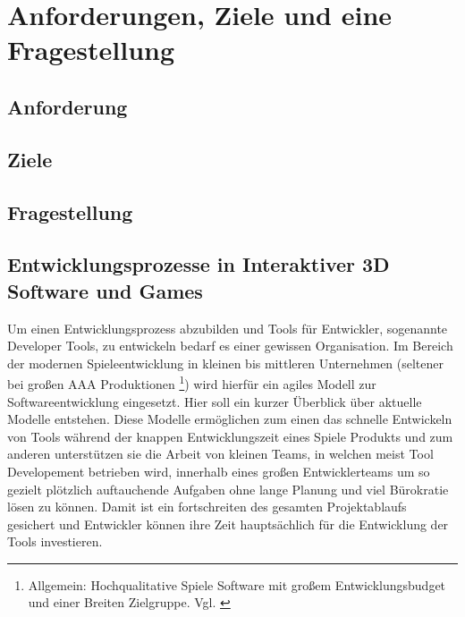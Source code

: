 \documentclass[pagesize, paper=a4, fontsize=12pt,titlepage=true, headings=small, headnosepline, abstractoff, liststotoc, nochapterprefix, plainheadsepline, twoside]{scrreprt}
\begin{document}
\begingroup
	\clearpage
	\pagestyle{empty}
	\tableofcontents
	\clearpage
\endgroup
\newpage
\thispagestyle{empty}
\mbox{}


\renewcommand*{\chapterpagestyle}{plain}
\pagestyle{plain}
\setcounter{page}{0}

\chapter{Anforderungen, Ziele und eine Fragestellung}

\section{Anforderung}
\section{Ziele}
\section{Fragestellung}

\section{Entwicklungsprozesse in Interaktiver 3D Software und Games}
Um einen Entwicklungsprozess abzubilden und Tools für Entwickler, sogenannte Developer Tools, zu entwickeln bedarf es einer gewissen Organisation. Im Bereich der modernen Spieleentwicklung in kleinen bis mittleren Unternehmen (seltener bei großen AAA Produktionen \footnote{Allgemein: Hochqualitative Spiele Software mit großem Entwicklungsbudget und einer Breiten Zielgruppe. Vgl. \cite{GamasutraAAA2005} }) wird hierfür ein agiles Modell zur Softwareentwicklung eingesetzt. Hier soll ein kurzer Überblick über aktuelle Modelle entstehen. Diese Modelle ermöglichen zum einen das schnelle Entwickeln von Tools während der knappen Entwicklungszeit eines Spiele Produkts und zum anderen unterstützen sie die Arbeit von kleinen Teams, in welchen meist Tool Developement betrieben wird,  innerhalb eines großen Entwicklerteams um so gezielt plötzlich auftauchende Aufgaben ohne lange Planung und viel Bürokratie lösen zu können. Damit ist ein fortschreiten des gesamten Projektablaufs gesichert und Entwickler können ihre Zeit hauptsächlich für die Entwicklung der Tools investieren.
\end{document}
